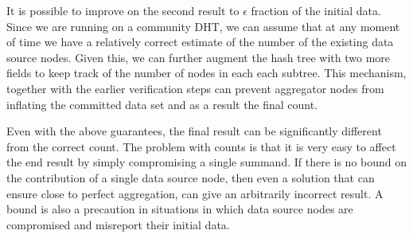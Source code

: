 \documentclass{article}
\begin{document}
It is possible to improve on the second result to $\epsilon$ fraction
of the initial data.  Since we are running
on a community DHT, we can assume that at any moment of time we have a
relatively correct estimate of the number of the existing data source
nodes. Given this, we can further augment the hash tree with two more
fields to keep track of the number of nodes in each each subtree. This
mechanism, together with the earlier verification steps can prevent
aggregator nodes from inflating the committed data set and as a result
the final count.


Even with the above guarantees, the final result can be significantly
different from the correct count. The problem with counts is that it
is very easy to affect the end result by simply compromising a single
summand. If there is no bound on the contribution of a single data
source node, then even a solution that can ensure close to perfect
aggregation, can give an arbitrarily incorrect result. A bound is also
a precaution in situations in which data source nodes are compromised
and misreport their initial data.
\end{document}
